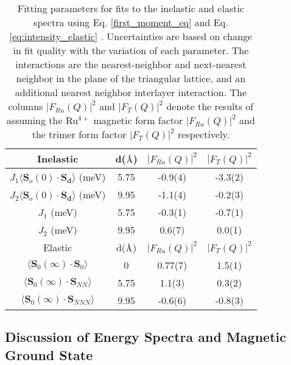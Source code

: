 \documentclass[%
 reprint,
superscriptaddress,
 amsmath,amssymb,
 aps,
 prb,
]{revtex4-2}
\newcommand{\angstrom}{\text{\normalfont\AA}}
\begin{document}
\begin{center}
\begin{table}
\centering
\noindent 
\begin{tabular}{||c|c|c|c||}
\hline
    Inelastic & d($\angstrom$) & $|F_{Ru}(Q)|^2$ & $|F_{T}(Q)|^2$  \\
    \hline 
     $J_1\langle \textbf{S}_o(0)\cdot \textbf{S}_\textbf{d} \rangle$ (meV)& 5.75 & -0.9(4) & -3.3(2) \\
     $J_2\langle \textbf{S}_o(0)\cdot \textbf{S}_\textbf{d} \rangle$ (meV)& 9.95 & -1.1(4) & -0.2(3) \\
     $J_1$ (meV) & 5.75 & -0.3(1) & -0.7(1)\\
     $J_2$ (meV) & 9.95 & 0.6(7) & 0.0(1)\\
    \hline \hline
    Elastic & d($\angstrom$) & $|F_{Ru}(Q)|^2$ & $|F_{T}(Q)|^2$ \\
    \hline 
     $\langle \textbf{S}_0(\infty) \cdot \textbf{S}_0 \rangle$ & 0 &  0.77(7) & 1.5(1)  \\
     $\langle \textbf{S}_0(\infty) \cdot \textbf{S}_{NN}\rangle$ & 5.75 &  1.1(3) & 0.3(2)  \\
     $\langle \textbf{S}_0(\infty) \cdot \textbf{S}_{NNN}\rangle$& 9.95 &  -0.6(6) &  -0.8(3) \\
     \hline 
\end{tabular}
\caption{Fitting parameters for fits to the inelastic and elastic spectra using Eq. \ref{first_moment_eq} and Eq. \ref{eq:intensity_elastic} . Uncertainties are based on change in fit quality with the variation of each parameter. The interactions are the nearest-neighbor and next-nearest neighbor in the plane of the triangular lattice, and an additional nearest neighbor interlayer interaction. The columns $|F_{Ru}(Q)|^2$ and $|F_{T}(Q)|^2$ denote the results of assuming the Ru$^{4+}$ magnetic form factor $|F_{Ru}(Q)|^2$ and the trimer form factor $|F_{T}(Q)|^2$ respectively. }
\label{table:fit_params_inelastic}
\end{table}
\end{center}

\subsection{Discussion of Energy Spectra and Magnetic Ground State}
\end{document}
